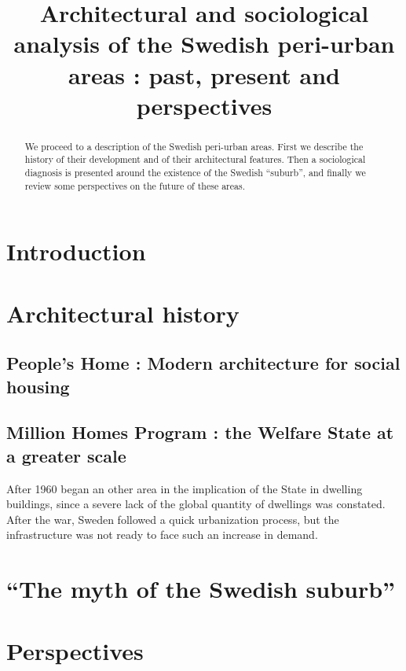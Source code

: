 \documentclass[english]{article}
\begin{document}
\title{Architectural and sociological analysis of the Swedish peri-urban
areas : past, present and perspectives}
\maketitle
\begin{abstract}
We proceed to a description of the Swedish peri-urban areas. First
we describe the history of their development and of their
architectural features. Then a sociological diagnosis is presented
around the existence of the Swedish ``suburb'', and finally we review
some perspectives on the future of these areas.
\end{abstract}

\section*{Introduction}


\section{Architectural history}


\subsection{People's Home : Modern architecture for social housing}


\subsection{Million Homes Program : the Welfare State at a greater scale}

After 1960 began an other area in the implication of the State in
dwelling buildings, since a severe lack of the global quantity of
dwellings was constated. After the war, Sweden followed a quick urbanization
process, but the infrastructure was not ready to face such an increase
in demand.


\section{``The myth of the Swedish suburb''}


\section{Perspectives}



\end{document}
